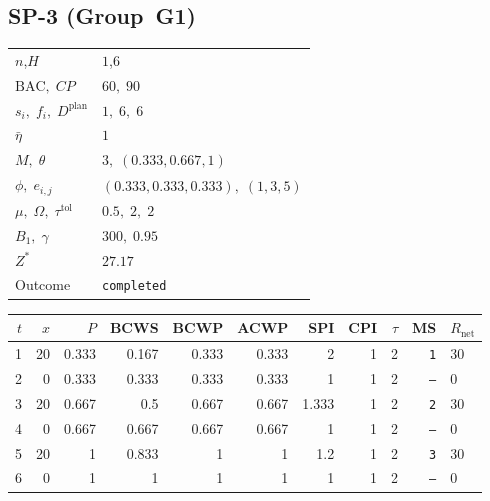 \documentclass[12pt, a4paper]{article}
\newcommand{\BAC}{\mathrm{BAC}}
\begin{document}
\newpage

\subsection*{SP-3  (Group~G1)}
\begin{center}
\begin{tabular}{ll}
\toprule
$n$,\;$H$ & $1$,\;$6$ \\
$\BAC,\;CP$ & $60,\;90$ \\
$s_i,\;f_i,\;D^{\mathrm{plan}}$ & $1,\;6,\;6$ \\
$\bar\eta$ & $1$ \\
$M,\;\theta$ & $3,\;(0.333,0.667,1)$ \\
$\phi,\;e_{i,j}$ & $(0.333,0.333,0.333),\;(1,3,5)$ \\
$\mu,\;\Omega,\;\tau^{\mathrm{tol}}$ & $0.5,\;2,\;2$ \\
$B_1,\;\gamma$ & $300,\;0.95$ \\
$Z^*$ & $27.17$ \\
Outcome & \texttt{completed} \\
\bottomrule
\end{tabular}
\end{center}

\begin{center}
\begin{tabular}{rrrrrrrrrrl}
\toprule
$t$ & $x$ & $P$ & BCWS & BCWP & ACWP & SPI & CPI & $\tau$ & MS & $R_{\mathrm{net}}$\\
\midrule
1 & 20 & 0.333 & 0.167 & 0.333 & 0.333 & 2 & 1 & 2 & \texttt{1} & 30 \\
2 & 0 & 0.333 & 0.333 & 0.333 & 0.333 & 1 & 1 & 2 & \texttt{---} & 0 \\
3 & 20 & 0.667 & 0.5 & 0.667 & 0.667 & 1.333 & 1 & 2 & \texttt{2} & 30 \\
4 & 0 & 0.667 & 0.667 & 0.667 & 0.667 & 1 & 1 & 2 & \texttt{---} & 0 \\
5 & 20 & 1 & 0.833 & 1 & 1 & 1.2 & 1 & 2 & \texttt{3} & 30 \\
6 & 0 & 1 & 1 & 1 & 1 & 1 & 1 & 2 & \texttt{---} & 0 \\
\bottomrule
\end{tabular}
\end{center}
\end{document}
